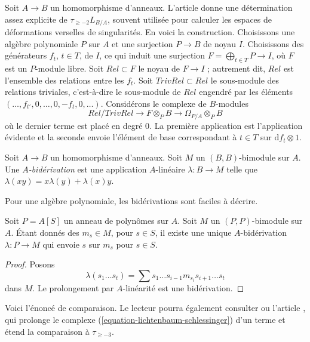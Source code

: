 \noindent
Soit $A \to B$ un homomorphisme d'anneaux. L'article
\cite{Lichtenbaum-Schlessinger} donne une détermination assez explicite de
$\tau_{\geq -2}L_{B/A}$, souvent utilisée pour calculer les espaces de
déformations verselles de singularités. En voici la construction. Choisissons
une algèbre polynomiale $P$ sur $A$ et une surjection $P \to B$ de noyau $I$.
Choisissons des générateurs $f_t$, $t \in T$, de $I$, ce qui induit une
surjection $F = \bigoplus_{t \in T} P \to I$, où $F$ est un $P$-module libre.
Soit $Rel \subset F$ le noyau de $F \to I$ ; autrement dit, $Rel$ est
l'ensemble des relations entre les $f_t$. Soit $TrivRel \subset Rel$ le
sous-module des relations triviales, c'est-à-dire le sous-module de $Rel$
engendré par les éléments
$(\ldots, f_{t'}, 0, \ldots, 0, -f_t, 0, \ldots)$. Considérons le complexe de
$B$-modules
\begin{equation}
\label{equation-lichtenbaum-schlessinger}
Rel/TrivRel \longrightarrow
F \otimes_P B \longrightarrow
\Omega_{P/A} \otimes_P B
\end{equation}
où le dernier terme est placé en degré $0$. La première application est
l'application évidente et la seconde envoie l'élément de base correspondant à
$t \in T$ sur $\text{d}f_t \otimes 1$.

\begin{definition}
\label{definition-biderivation}
Soit $A \to B$ un homomorphisme d'anneaux. Soit $M$ un $(B, B)$-bimodule sur
$A$. Une {\it $A$-bidérivation} est une application $A$-linéaire
$\lambda : B \to M$ telle que $\lambda(xy) = x\lambda(y) + \lambda(x)y$.
\end{definition}

\noindent
Pour une algèbre polynomiale, les bidérivations sont faciles à décrire.

\begin{lemma}
\label{lemma-polynomial-ring-unique}
Soit $P = A[S]$ un anneau de polynômes sur $A$. Soit $M$ un
$(P, P)$-bimodule sur $A$. Étant donnés des $m_s \in M$, pour $s \in S$, il
existe une unique $A$-bidérivation $\lambda : P \to M$ qui envoie $s$ sur
$m_s$ pour $s \in S$.
\end{lemma}

\begin{proof}
Posons
$$
\lambda(s_1 \ldots s_t) =
\sum s_1 \ldots s_{i - 1} m_{s_i} s_{i + 1} \ldots s_t
$$
dans $M$. Le prolongement par $A$-linéarité est une bidérivation.
\end{proof}

\noindent
Voici l'énoncé de comparaison. Le lecteur pourra également consulter
\cite[page 206, Proposition 12]{Andre-Homologie} ou l'article \cite{Doncel},
qui prolonge le complexe (\ref{equation-lichtenbaum-schlessinger}) d'un terme
et étend la comparaison à $\tau_{\geq -3}$.

